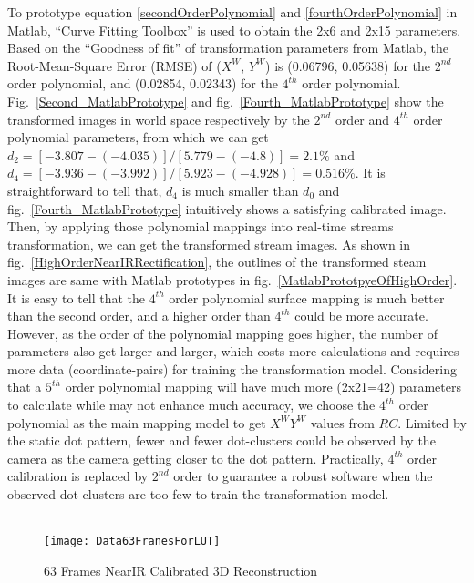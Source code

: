 %
\noindent
To prototype equation \ref{secondOrderPolynomial} and \ref{fourthOrderPolynomial} in Matlab, \enquote{Curve Fitting Toolbox} is used to obtain the 2x6 and 2x15 parameters. Based on the \enquote{Goodness of fit} of transformation parameters from Matlab, the Root-Mean-Square Error (RMSE) of (\(X^W\), \(Y^W\)) is (0.06796, 0.05638) for the \(2^{nd}\) order polynomial, and (0.02854, 0.02343) for the \(4^{th}\) order polynomial. Fig.~\ref{Second_MatlabPrototype} and fig.~\ref{Fourth_MatlabPrototype} show the transformed images in world space respectively by the \(2^{nd}\) order and \(4^{th}\) order polynomial parameters, from which we can get \(d_2 = [-3.807 - (-4.035)] / [5.779 - (-4.8)] = 2.1\%\) and \(d_4 = [-3.936 - (-3.992)] / [5.923 - (-4.928)] = 0.516\%\). It is straightforward to tell that, \(d_4\) is much smaller than \(d_0\) and fig.~\ref{Fourth_MatlabPrototype} intuitively shows a satisfying calibrated image.
\\\indent
Then, by applying those polynomial mappings into real-time streams transformation, we can get the transformed stream images. As shown in fig.~\ref{HighOrderNearIRRectification}, the outlines of the transformed steam images are same with Matlab prototypes in fig.~\ref{MatlabPrototpyeOfHighOrder}. It is easy to tell that the \(4^{th}\) order polynomial surface mapping is much better than the second order, and a higher order than \(4^{th}\) could be more accurate. However, as the order of the polynomial mapping goes higher, the number of parameters also get larger and larger, which costs more calculations and requires more data (coordinate-pairs) for training the transformation model. Considering that a \(5^{th}\) order polynomial mapping will have much more (2x21=42) parameters to calculate while may not enhance much accuracy, we choose the \(4^{th}\) order polynomial as the main mapping model to get \(X^WY^W\) values from \(RC\). Limited by the static dot pattern, fewer and fewer dot-clusters could be observed by the camera as the camera getting closer to the dot pattern. Practically, \(4^{th}\) order calibration is replaced by \(2^{nd}\) order to guarantee a robust software when the observed dot-clusters are too few to train the transformation model.
\\\\\indent
%
\begin{figure}[t]
\centering
\texttt{[image: Data63FranesForLUT]}
\caption{63 Frames NearIR Calibrated 3D Reconstruction}
\label{Data63FranesForLUT}
\end{figure}%
